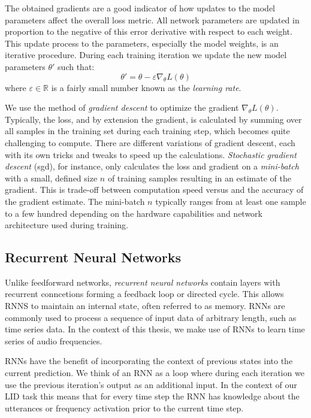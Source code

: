 The obtained gradients are a good indicator of how updates to the model parameters affect the overall loss metric. All network parameters are updated in proportion to the negative of this error derivative with respect to each weight. This update process to the parameters, especially the model weights, is an iterative procedure. During each training iteration we update the new model parameters $\theta'$ such that:
$$
\theta' = \theta - \varepsilon \nabla_\theta L(\theta)
$$
where $\varepsilon \in\mathbb{R}$ is a fairly small number known as the \emph{learning rate}. 

We use the method of \emph{gradient descent} to optimize the gradient $\nabla_\theta L(\theta)$. Typically, the loss, and by extension the gradient, is calculated by summing over all samples in the training set during each training step, which becomes quite challenging to compute. There are different variations of gradient descent, each with its own tricks and tweaks to speed up the calculations. \emph{Stochastic gradient descent} (\ac{sgd}), for instance, only calculates the loss and gradient on a \emph{mini-batch} with a small, defined size $n$ of training samples resulting in an estimate of the gradient. This is trade-off between computation speed versus and the accuracy of the gradient estimate. The mini-batch $n$ typically ranges from at least one sample to a few hundred depending on the hardware capabilities and network architecture used during training.


\subsection{Recurrent Neural Networks}
Unlike feedforward networks, \emph{recurrent neural networks} contain layers with recurrent conncetions forming a feedback loop or directed cycle. This allows RNNS to maintain an internal state, often referred to as memory. RNNs are commonly used to process a sequence of input data of arbitrary length, such as time series data. In the context of this thesis, we make use of RNNs to learn time series of audio frequencies.

	RNNs have the benefit of incorporating the context of previous states into the current prediction. We think of an RNN as a loop where during each iteration we use the previous iteration's output as an additional input. In the context of our LID task this means that for every time step the RNN has knowledge about the utterances or frequency activation prior to the current time step.

